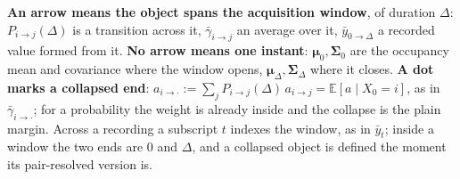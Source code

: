 \begin{appendixbox}
\begin{tcolorbox}[title={Three marks, and each one says one thing}, colback=gray!5, colframe=gray!55]
\textbf{An arrow means the object spans the acquisition window}, of duration $\Delta$:
$P_{i\to j}(\Delta)$ is a transition across it, $\bar\gamma_{i\to j}$ an average over it,
$\bar y_{0\to\Delta}$ a recorded value formed from it. \textbf{No arrow means one instant}:
$\bm{\mu}_0,\bm{\Sigma}_0$ are the occupancy mean and covariance where the window opens,
$\bm{\mu}_\Delta,\bm{\Sigma}_\Delta$ where it closes. \textbf{A dot marks a collapsed end}:
$a_{i\to\cdot}:=\sum_j P_{i\to j}(\Delta)\,a_{i\to j}=\mathbb{E}[a\mid X_0=i]$, as in
$\bar\gamma_{i\to\cdot}$; for a probability the weight is already inside and the collapse is the
plain margin. Across a recording a subscript $t$ indexes the window, as in $\bar y_t$; inside a window the two
ends are $0$ and $\Delta$, and a collapsed object is defined the moment its pair-resolved version is.
\end{tcolorbox}


\end{appendixbox}

